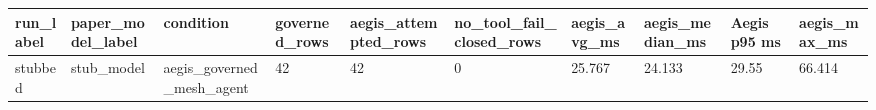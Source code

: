 \begin{tabular}{llllllllll}
 \hline
run\_label & paper\_model\_label & condition & governed\_rows & aegis\_attempted\_rows & no\_tool\_fail\_closed\_rows & aegis\_avg\_ms & aegis\_median\_ms & Aegis p95 ms & aegis\_max\_ms \\
 \hline
stubbed & stub\_model & aegis\_governed\_mesh\_agent & 42 & 42 & 0 & 25.767 & 24.133 & 29.55 & 66.414 \\
 \hline
\end{tabular}
